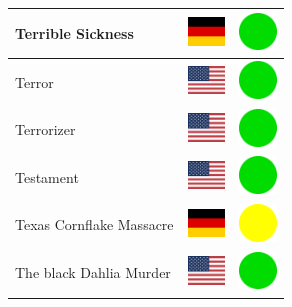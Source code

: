 \documentclass[12pt, a4paper, twoside]{report}
\begin{document}
\begin{center}
\begin{longtable}{|p{5cm}|p{2cm}|p{2cm}|}
 Terrible Sickness                                          & \includegraphics[width=1cm]{../4x3/de} &   \includegraphics[width=1cm]{../likes/y} \\ \hline
 Terror                                                     & \includegraphics[width=1cm]{../4x3/us} &   \includegraphics[width=1cm]{../likes/y} \\ \hline
 Terrorizer                                                 & \includegraphics[width=1cm]{../4x3/us} &   \includegraphics[width=1cm]{../likes/y} \\ \hline
 Testament                                                  & \includegraphics[width=1cm]{../4x3/us} &   \includegraphics[width=1cm]{../likes/y} \\ \hline
 Texas Cornflake Massacre                                   & \includegraphics[width=1cm]{../4x3/de} &   \includegraphics[width=1cm]{../likes/m} \\ \hline
 The black Dahlia Murder                                    & \includegraphics[width=1cm]{../4x3/us} &   \includegraphics[width=1cm]{../likes/y} \\ \hline

\end{longtable}
\end{center}
\end{document}

